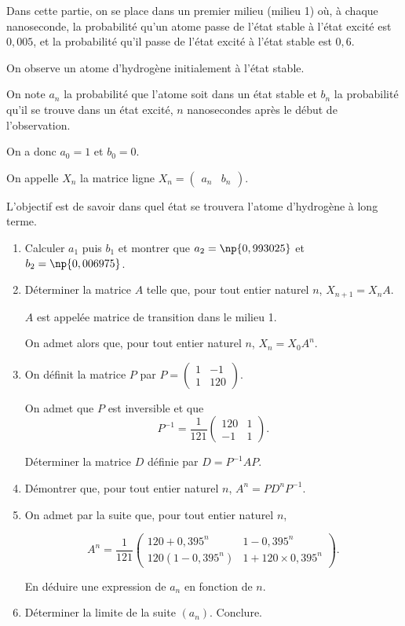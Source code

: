 \documentclass[10pt,a4paper]{article}
\begin{document}
Dans cette partie, on se place dans un premier milieu (milieu 1) où, à chaque nanoseconde, la probabilité qu'un atome passe de l'état stable à l'état excité est $0,005$, et la probabilité qu'il passe de l'état excité à l'état stable est $0,6$.

On observe un atome d'hydrogène initialement à l'état stable.

On note $a_n$ la probabilité que l'atome soit dans un état stable et $b_n$ la probabilité qu'il se trouve dans un état excité, $n$ nanosecondes après le début de l'observation.

On a donc $a_0 = 1$ et $b_0 = 0$.

On appelle $X_n$ la matrice ligne $X_n = \begin{pmatrix}a_n& b_n\end{pmatrix}$.

L'objectif est de savoir dans quel état se trouvera l'atome d'hydrogène à long terme.

\medskip

\begin{enumerate}
\item Calculer $a_1$ puis $b_1$ et montrer que $a_2 = \np{0,993025}$ et $b_2 = \np{0,006975}$.
\item Déterminer la matrice $A$ telle que, pour tout entier naturel $n$,\: $X_{n+1} = X_n A$.

$A$ est appelée matrice de transition dans le milieu 1.

On admet alors que, pour tout entier naturel $n$,\: $X_n = X_0A^n$.

\item On définit la matrice $P$ par $P = \begin{pmatrix}1&-1\\ 1&120\end{pmatrix}$.

On admet que $P$ est inversible et que
\[P^{-1} = \dfrac{1}{121}\begin{pmatrix}120&1\\- 1&1\end{pmatrix}.\]

Déterminer la matrice $D$ définie par $D = P^{-1} AP$.
\item Démontrer que, pour tout entier naturel $n$,\: $A^n = P D^n P^{-1}$.
\item On admet par la suite que, pour tout entier naturel $n$,

\[A^n = \dfrac{1}{121}\begin{pmatrix}120 + 0,395^n&1 - 0,395^n\\120\left(1 - 0,395^n\right)&1 + 120 \times 0,395^n\end{pmatrix}.\]

En déduire une expression de $a_n$ en fonction de $n$.
\item Déterminer la limite de la suite $\left(a_n\right)$. Conclure.
\end{enumerate}
\end{document}
